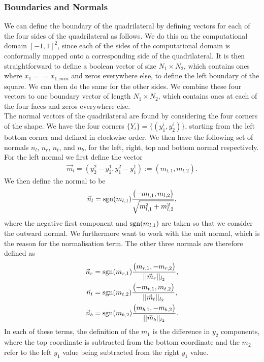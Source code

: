 \subsubsection*{Boundaries and Normals}
We can define the boundary of the quadrilateral by defining vectors for each of the four sides of the quadrilateral as follows. We do this on the computational domain $[-1,1]^2$, since each of the sides of the computational domain is conformally mapped onto a corresponding side of the quadrilateral. It is then straightforward to define a boolean vector of size $N_1 \times N_2$, which contains ones where $x_1 == x_{1,min}$ and zeros everywhere else, to define the left boundary of the square. We can then do the same for the other sides. We combine these four vectors to one boundary vector of length $N_1 \times N_2$, which contains ones at each of the four faces and zeros everywhere else. 
\\
The normal vectors of the quadrilateral are found by considering the four corners of the shape. We have the four corners $\{Y_i\} = \{(y_1^i,y_2^i)\}$, starting from the left bottom corner and defined in clockwise order. We then have the following set of normals $n_l$, $n_r$, $n_t$, and $n_b$, for the left, right, top and bottom normal respectively.
For the left normal we first define the vector
\begin{align*}
     \vec m_l = \left(y_2^2 - y_2^1, y_1^2 - y_1^1 \right) := \left(m_{l,1},m_{l,2} \right). 
\end{align*}
We then define the normal to be
\begin{align*}
	\vec n_l =  \operatorname{sgn} (m_{l,1})\frac{\left(-m_{l,1},m_{l,2} \right)}{\sqrt{m_{l,1}^2+m_{l,2}^2 }},
\end{align*}
where the negative first component and $\operatorname{sgn} (m_{l,1})$ are taken so that we 
consider the outward normal. We furthermore want to work with the unit normal, which is the reason for the normalisation term. The other three normals are therefore defined as
\begin{align*}
	\vec n_r &=  \operatorname{sgn} (m_{r,1})\frac{\left(m_{r,1}, - m_{r,2} \right)}{||\vec m_{r} ||_{l_2}},\\
	\vec n_t &=  \operatorname{sgn} (m_{t,2})\frac{\left(-m_{t,1},m_{t,2} \right)}{||\vec m_{t} ||_{l_2}},\\
	\vec n_b &=  \operatorname{sgn} (m_{b,2})\frac{\left(m_{b,1},-m_{b,2} \right)}{||\vec m_{b} ||_{l_2}}.
\end{align*}
In each of these terms, the definition of the $m_1$ is the difference in $y_2$ components, where the top coordinate is subtracted from the bottom coordinate and the $m_2$ refer to the left $y_1$ value being subtracted from the right $y_1$ value.

